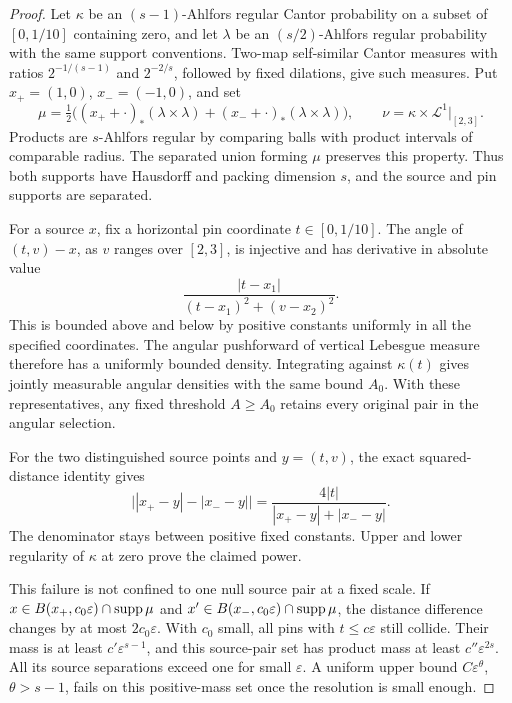 \begin{proof}
Let \(\kappa\) be an \((s-1)\)-Ahlfors regular Cantor probability
on a subset of \([0,1/10]\) containing zero, and let \(\lambda\)
be an \((s/2)\)-Ahlfors regular probability with the same support
conventions. Two-map self-similar Cantor measures with ratios
\(2^{-1/(s-1)}\) and \(2^{-2/s}\), followed by fixed dilations,
give such measures. Put \(x_+=(1,0)\), \(x_-=(-1,0)\), and set
\[
 \mu=\tfrac12\bigl((x_++\cdot)_*(\lambda\times\lambda)
                 +(x_-+\cdot)_*(\lambda\times\lambda)\bigr),
 \qquad
 \nu=\kappa\times\mathcal L^1|_{[2,3]}.
\]
Products are \(s\)-Ahlfors regular by comparing balls with product
intervals of comparable radius. The separated union forming \(\mu\)
preserves this property. Thus both supports have Hausdorff and packing
dimension \(s\), and the source and pin supports are separated.

For a source \(x\), fix a horizontal pin coordinate \(t\in[0,1/10]\).
The angle of \((t,v)-x\), as \(v\) ranges over \([2,3]\), is
injective and has derivative in absolute value
\[
 \frac{|t-x_1|}{(t-x_1)^2+(v-x_2)^2}.
\]
This is bounded above and below by positive constants uniformly in all
the specified coordinates. The angular pushforward of vertical Lebesgue
measure therefore has a uniformly bounded density. Integrating against
\(\kappa(t)\) gives jointly measurable angular densities with the
same bound \(A_0\). With these representatives, any fixed threshold
\(A\ge A_0\) retains every original pair in the angular selection.

For the two distinguished source points and \(y=(t,v)\), the exact
squared-distance identity gives
\[
 \bigl||x_+-y|-|x_--y|\bigr|
 =\frac{4|t|}{|x_+-y|+|x_--y|}.
\]
The denominator stays between positive fixed constants. Upper and lower
regularity of \(\kappa\) at zero prove the claimed power.

This failure is not confined to one null source pair at a fixed scale.
If \(x\in B(x_+,c_0\varepsilon)\cap\operatorname{supp}\mu\) and
\(x'\in B(x_-,c_0\varepsilon)\cap\operatorname{supp}\mu\), the distance
difference changes by at most \(2c_0\varepsilon\). With \(c_0\)
small, all pins with \(t\le c\varepsilon\) still collide.
Their mass is at least \(c'\varepsilon^{s-1}\), and this source-pair
set has product mass at least \(c''\varepsilon^{2s}\).
All its source separations exceed one for small \(\varepsilon\).
A uniform upper bound \(C\varepsilon^\theta\), \(\theta>s-1\),
fails on this positive-mass set once the resolution is small enough.
\end{proof}

